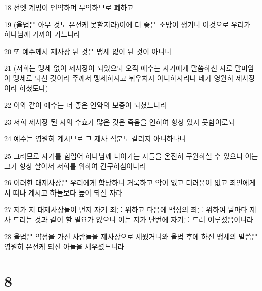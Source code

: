 \par 18 전엣 계명이 연약하며 무익하므로 폐하고
\par 19 (율법은 아무 것도 온전케 못할지라)이에 더 좋은 소망이 생기니 이것으로 우리가 하나님께 가까이 가느니라
\par 20 또 예수께서 제사장 된 것은 맹세 없이 된 것이 아니니
\par 21 (저희는 맹세 없이 제사장이 되었으되 오직 예수는 자기에게 말씀하신 자로 말미암아 맹세로 되신 것이라 주께서 맹세하시고 뉘우치지 아니하시리니 네가 영원히 제사장이라 하셨도다)
\par 22 이와 같이 예수는 더 좋은 언약의 보증이 되셨느니라
\par 23 저희 제사장 된 자의 수효가 많은 것은 죽음을 인하여 항상 있지 못함이로되
\par 24 예수는 영원히 계시므로 그 제사 직분도 갈리지 아니하나니
\par 25 그러므로 자기를 힘입어 하나님께 나아가는 자들을 온전히 구원하실 수 있으니 이는 그가 항상 살아서 저희를 위하여 간구하심이니라
\par 26 이러한 대제사장은 우리에게 합당하니 거룩하고 악이 없고 더러움이 없고 죄인에게서 떠나 계시고 하늘보다 높이 되신 자라
\par 27 저가 저 대제사장들이 먼저 자기 죄를 위하고 다음에 백성의 죄를 위하여 날마다 제사 드리는 것과 같이 할 필요가 없으니 이는 저가 단번에 자기를 드려 이루셨음이니라
\par 28 율법은 약점을 가진 사람들을 제사장으로 세웠거니와 율법 후에 하신 맹세의 말씀은 영원히 온전케 되신 아들을 세우셨느니라

\chapter{8}


